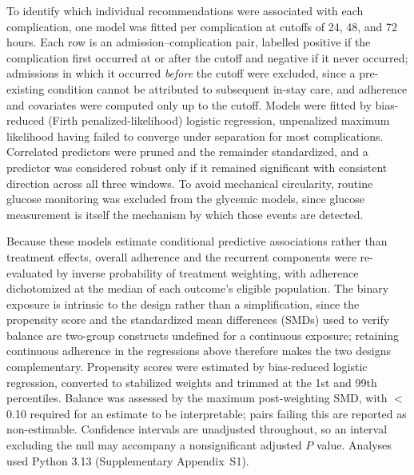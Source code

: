To identify which individual recommendations were associated with each
complication, one model was fitted per complication at cutoffs of 24, 48, and
72 hours. Each row is an admission--complication pair, labelled positive if the
complication first occurred at or after the cutoff and negative if it never
occurred; admissions in which it occurred \emph{before} the cutoff were
excluded, since a pre-existing condition cannot be attributed to subsequent
in-stay care, and adherence and covariates were computed only up to the cutoff.
Models were fitted by bias-reduced (Firth penalized-likelihood) logistic
regression,\citep{firth1993bias} unpenalized maximum likelihood having failed
to converge under separation for most complications. Correlated predictors were
pruned and the remainder standardized, and a predictor was considered robust
only if it remained significant with consistent direction across all three
windows. To avoid mechanical circularity, routine glucose monitoring was
excluded from the glycemic models, since glucose measurement is itself the
mechanism by which those events are detected.

Because these models estimate conditional predictive associations rather than
treatment effects, overall adherence and the recurrent components were
re-evaluated by inverse probability of treatment weighting, with adherence
dichotomized at the median of each outcome's eligible population. The binary
exposure is intrinsic to the design rather than a simplification, since the
propensity score \citep{rosenbaum1983central} and the standardized mean
differences (SMDs) used to verify balance \citep{austin2009balance} are
two-group constructs undefined for a continuous exposure; retaining continuous
adherence in the regressions above therefore makes the two designs
complementary. Propensity scores were estimated by bias-reduced logistic
regression, converted to stabilized weights and trimmed at the 1st and 99th
percentiles. Balance was assessed by the maximum post-weighting SMD, with
$<$0.10 required for an estimate to be interpretable; pairs failing this are
reported as non-estimable. Confidence intervals are unadjusted throughout, so an
interval excluding the null may accompany a nonsignificant adjusted $P$ value.
Analyses used Python 3.13 (Supplementary Appendix~S1).
